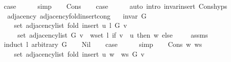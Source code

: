 \begin{isabellebody}
\ {\isacharquery}{\kern0pt}case\isanewline
\ \ \ \ \isamarkupfalse%
\ simp\isanewline
{}\isamarkupfalse%
\isanewline
\ \ \isamarkupfalse%
\ Cons\isanewline
\ \ \isamarkupfalse%
\ {\isacharquery}{\kern0pt}case\isanewline
\ \ \ \ \isamarkupfalse%
\ {\isacharparenleft}{\kern0pt}auto\ intro{\isacharcolon}{\kern0pt}\ invar{\isacharunderscore}{\kern0pt}insert{\isacharprime}{\kern0pt}\ Cons{\isachardot}{\kern0pt}hyps{\isacharparenright}{\kern0pt}\isanewline
{}\isamarkupfalse%
%
\endisatagproof
{\isafoldproof}%
%
\isadelimproof
\isanewline
%
\endisadelimproof
\isanewline
{}\isamarkupfalse%
\ {\isacharparenleft}{\kern0pt}\ adjacency{\isacharparenright}{\kern0pt}\ adjacency{\isacharunderscore}{\kern0pt}fold{\isacharunderscore}{\kern0pt}insert{\isacharprime}{\kern0pt}{\isacharunderscore}{\kern0pt}cong{\isacharcolon}{\kern0pt}\isanewline
\ \ \ {\isachardoublequoteopen}invar\ G{\isachardoublequoteclose}\isanewline
\ \ \isanewline
\ \ \ \ {\isachardoublequoteopen}set\ {\isacharparenleft}{\kern0pt}adjacency{\isacharunderscore}{\kern0pt}list\ {\isacharparenleft}{\kern0pt}fold\ {\isacharparenleft}{\kern0pt}insert{\isacharprime}{\kern0pt}\ u{\isacharparenright}{\kern0pt}\ l\ G{\isacharparenright}{\kern0pt}\ v{\isacharparenright}{\kern0pt}\ {\isacharequal}{\kern0pt}\isanewline
\ \ \ \ \ set\ {\isacharparenleft}{\kern0pt}adjacency{\isacharunderscore}{\kern0pt}list\ G\ v{\isacharparenright}{\kern0pt}\ {\isasymunion}\ {\isacharparenleft}{\kern0pt}{\isasymUnion}w{\isasymin}set\ l{\isachardot}{\kern0pt}\ if\ v\ {\isacharequal}{\kern0pt}\ u\ then\ {\isacharbraceleft}{\kern0pt}w{\isacharbraceright}{\kern0pt}\ else\ {\isacharbraceleft}{\kern0pt}{\isacharbraceright}{\kern0pt}{\isacharparenright}{\kern0pt}{\isachardoublequoteclose}\isanewline
%
\isadelimproof
\ \ %
\endisadelimproof
%
\isatagproof
{}\isamarkupfalse%
\ assms\isanewline
{}\isamarkupfalse%
\ {\isacharparenleft}{\kern0pt}induct\ l\ arbitrary{\isacharcolon}{\kern0pt}\ G{\isacharparenright}{\kern0pt}\isanewline
\ \ \isamarkupfalse%
\ Nil\isanewline
\ \ \isamarkupfalse%
\ {\isacharquery}{\kern0pt}case\isanewline
\ \ \ \ \isamarkupfalse%
\ simp\isanewline
{}\isamarkupfalse%
\isanewline
\ \ \isamarkupfalse%
\ {\isacharparenleft}{\kern0pt}Cons\ w\ ws{\isacharparenright}{\kern0pt}\isanewline
\ \ \isamarkupfalse%
\isanewline
\ \ \ \ {\isachardoublequoteopen}set\ {\isacharparenleft}{\kern0pt}adjacency{\isacharunderscore}{\kern0pt}list\ {\isacharparenleft}{\kern0pt}fold\ {\isacharparenleft}{\kern0pt}insert{\isacharprime}{\kern0pt}\ u{\isacharparenright}{\kern0pt}\ {\isacharparenleft}{\kern0pt}w\ {\isacharhash}{\kern0pt}\ ws{\isacharparenright}{\kern0pt}\ G{\isacharparenright}{\kern0pt}\ v{\isacharparenright}{\kern0pt}\ {\isacharequal}{\kern0pt}\isanewline

\end{isabellebody}
